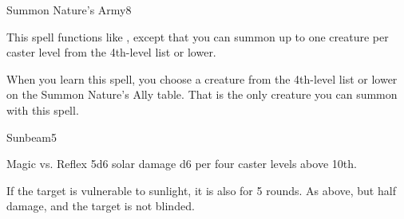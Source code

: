 \begin{spellsection}{Summon Nature's Army}{8}
\begin{spellheader}
\end{spellheader}
\begin{spellcontent}
    \spelleffect This spell functions like , except that you can summon up to one creature per caster level from the 4th-level list or lower.
    \par When you learn this spell, you choose a creature from the 4th-level list or lower on the Summon Nature's Ally table. That is the only creature you can summon with this spell.
    \spelldur \durshort \dismissable
\end{spellcontent}
\begin{spellfooter}
\end{spellfooter}
\end{spellsection}

\begin{spellsection}{Sunbeam}{5}
\begin{spellheader}
    \begin{spelltargetinginfo}
    \end{spelltargetinginfo}
\end{spellheader}
\begin{spellcontent}
    \begin{spelleffects}
        \begin{spellattack}{Magic vs. Reflex}
            \spellsuccess 5d6 solar damage \add d6 per four caster levels above 10th.

            If the target is vulnerable to sunlight, it is also \blinded for 5 rounds.
            \spellfailure As above, but half damage, and the target is not blinded.
        \end{spellattack}
    \end{spelleffects}
\end{spellcontent}
\begin{spellfooter}
\end{spellfooter}
\end{spellsection}

